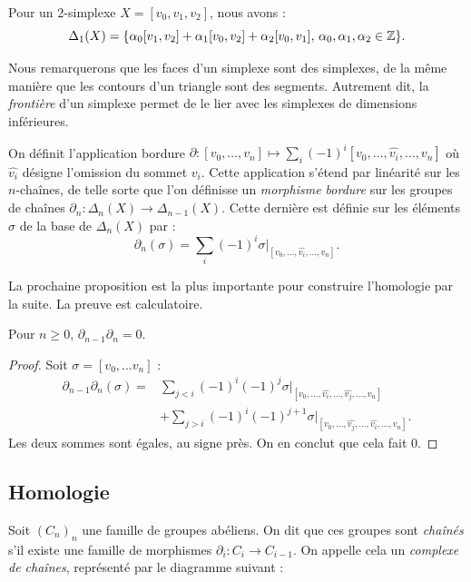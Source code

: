 \begin{exemple}
Pour un $2$-simplexe $X=[v_0,v_1,v_2]$, nous avons :$$\Delta_1(X)=\{\alpha_0[v_1,v_2]+\alpha_1[v_0,v_2]+\alpha_2[v_0,v_1],\,\alpha_0,\alpha_1,\alpha_2\in\mathbb{Z}\}.$$
\end{exemple}

Nous remarquerons que les faces d'un simplexe sont des simplexes, de la même manière que les contours d'un triangle sont des segments. Autrement dit, la \emph{frontière} d'un simplexe permet de le lier avec les simplexes de dimensions inférieures.

\begin{definition}
On définit l'application bordure $\partial:[v_0,\ldots,v_n]\mapsto\sum_i(-1)^i[v_0,\ldots,\hat{v_i},\ldots,v_n]$ où $\hat{v_i}$ désigne l'omission du sommet $v_i$. Cette application s'étend par linéarité sur les $n$-chaînes, de telle sorte que l'on définisse un \emph{morphisme bordure} sur les groupes de chaînes $\partial_n:\Delta_n(X)\to\Delta_{n-1}(X)$. Cette dernière est définie sur les éléments $\sigma$ de la base de $\Delta_n(X)$ par : \[\partial_n(\sigma)=\sum_i(-1)^i\sigma|_{[v_0,...,\hat{v_i},...,v_n]}.\]
\end{definition}

La prochaine proposition est la plus importante pour construire l'homologie par la suite. La preuve est calculatoire.

\begin{proposition}
Pour $n\geq0$, $\partial_{n-1}\partial_n=0$.
\end{proposition}
\begin{proof}Soit $\sigma=[v_0,...v_n]$ : \[\begin{split}
\partial_{n-1}\partial_n(\sigma)=&\sum_{j<i}(-1)^i(-1)^j\sigma|_{[v_0,...,\hat{v_i},...,\hat{v_j},...,v_n]}\\
&+\sum_{j>i}(-1)^i(-1)^{j+1}\sigma|_{[v_0,...,\hat{v_j},...,\hat{v_i},...,v_n]}.
\end{split}\]Les deux sommes sont égales, au signe près. On en conclut que cela fait 0. 
\end{proof}


\subsection{Homologie}\label{sect:simpl-homology}

Soit $(C_n)_n$ une famille de groupes abéliens. On dit que ces groupes sont \emph{chaînés} s'il existe une famille de morphismes $\partial_i: C_{i}\to C_{i-1}$. On appelle cela un \emph{complexe de chaînes}, représenté par le diagramme suivant :

